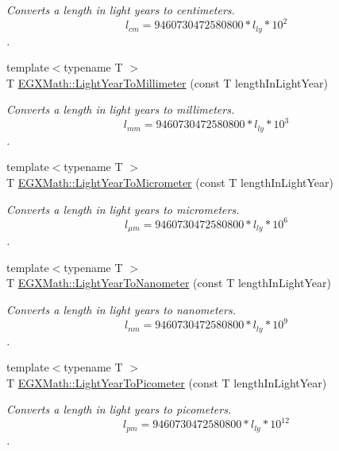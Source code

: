 \begin{DoxyCompactItemize}
\begin{DoxyCompactList}\small\item\em Converts a length in light years to centimeters. \[ l_{cm}=9460730472580800 * l_{ly} * 10^{2} \]. \end{DoxyCompactList}\item 
{\footnotesize template$<$typename T $>$ }\\T \mbox{\hyperlink{group___e_g_x_math-_conversions-_length_conversions-_astronomical-_light_year-_s_i_ga667fa52ea9719ece8243c50376499c78}{E\+G\+X\+Math\+::\+Light\+Year\+To\+Millimeter}} (const T length\+In\+Light\+Year)
\begin{DoxyCompactList}\small\item\em Converts a length in light years to millimeters. \[ l_{mm}=9460730472580800 * l_{ly} * 10^{3} \]. \end{DoxyCompactList}\item 
{\footnotesize template$<$typename T $>$ }\\T \mbox{\hyperlink{group___e_g_x_math-_conversions-_length_conversions-_astronomical-_light_year-_s_i_gaa3dbed351199e0c91fb3e72aea833233}{E\+G\+X\+Math\+::\+Light\+Year\+To\+Micrometer}} (const T length\+In\+Light\+Year)
\begin{DoxyCompactList}\small\item\em Converts a length in light years to micrometers. \[ l_{\mu m}=9460730472580800 * l_{ly} * 10^{6} \]. \end{DoxyCompactList}\item 
{\footnotesize template$<$typename T $>$ }\\T \mbox{\hyperlink{group___e_g_x_math-_conversions-_length_conversions-_astronomical-_light_year-_s_i_ga1e2666960159c36972f39a0630389b4e}{E\+G\+X\+Math\+::\+Light\+Year\+To\+Nanometer}} (const T length\+In\+Light\+Year)
\begin{DoxyCompactList}\small\item\em Converts a length in light years to nanometers. \[ l_{nm}=9460730472580800 * l_{ly} * 10^{9} \]. \end{DoxyCompactList}\item 
{\footnotesize template$<$typename T $>$ }\\T \mbox{\hyperlink{group___e_g_x_math-_conversions-_length_conversions-_astronomical-_light_year-_s_i_ga6dc5dc3c9584f578c4a935552fb965b7}{E\+G\+X\+Math\+::\+Light\+Year\+To\+Picometer}} (const T length\+In\+Light\+Year)
\begin{DoxyCompactList}\small\item\em Converts a length in light years to picometers. \[ l_{pm}=9460730472580800 * l_{ly} * 10^{12} \]. \end{DoxyCompactList}\item 

\end{DoxyCompactItemize}
